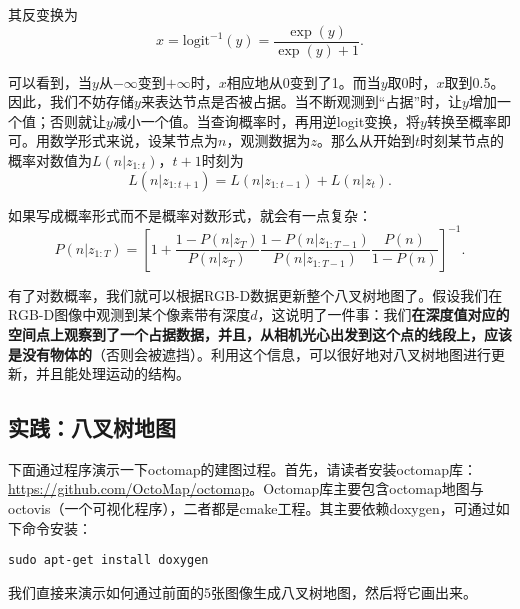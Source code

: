 其反变换为
\begin{equation}
x = \mathrm{logit}^{-1}(y) = \frac{\exp(y)}{\exp(y)+1}.
\end{equation}

\enlargethispage{4pt}
可以看到，当$y$从$-\infty$变到$+\infty$时，$x$相应地从0变到了1。而当$y$取0时，$x$取到0.5。因此，我们不妨存储$y$来表达节点是否被占据。当不断观测到“占据”时，让$y$增加一个值；否则就让$y$减小一个值。当查询概率时，再用逆logit变换，将$y$转换至概率即可。用数学形式来说，设某节点为$n$，观测数据为$z$。那么从开始到$t$时刻某节点的概率对数值为$L(n|z_{1:t})$，$t+1$时刻为
\clearpage
\begin{equation}
L(n|z_{1:t+1}) = L(n|z_{1:t-1}) + L(n|z_{t}).
\end{equation}

如果写成概率形式而不是概率对数形式，就会有一点复杂：
\begin{equation}
P(n|z_{1:T}) =  \left[ 1+ \frac{1-P(n|z_T)}{P(n|z_T)} \frac{1-P(n|z_{1:T-1})}{P(n|z_{1:T-1})} \frac{P(n)}{1-P(n)} \right]^{-1}.
\end{equation}

有了对数概率，我们就可以根据RGB-D数据更新整个八叉树地图了。假设我们在RGB-D图像中观测到某个像素带有深度$d$，这说明了一件事：我们\textbf{在深度值对应的空间点上观察到了一个占据数据，并且，从相机光心出发到这个点的线段上，应该是没有物体的}（否则会被遮挡）。利用这个信息，可以很好地对八叉树地图进行更新，并且能处理运动的结构。

\subsection{实践：八叉树地图}
下面通过程序演示一下octomap的建图过程。首先，请读者安装octomap库：\url{https://github.com/OctoMap/octomap}。Octomap库主要包含octomap地图与octovis（一个可视化程序），二者都是cmake工程。其主要依赖doxygen，可通过如下命令安装：
\begin{lstlisting}
sudo apt-get install doxygen 
\end{lstlisting}

我们直接来演示如何通过前面的5张图像生成八叉树地图，然后将它画出来。

